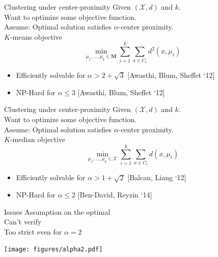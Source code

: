 \documentclass{beamer}
\newcommand{\mc}{\mathcal}
\newcommand{\mb}{\mathbf}
\begin{document}
\begin{frame}{Clustering under center-proximity}
	Given $(\mc X, d)$ and $k$.\\
	Want to optimize some objective function.\\
	
	\vspace{0.5cm}Assume: Optimal solution satisfies $\alpha$-center proximity.\\
	
	\vspace{1cm}$K$-means objective
	$$\min_{\mu_1, \ldots, \mu_k \in \mb M} \sum_{i =1}^k \sum_{x \in C_i} d^2(x, \mu_i)$$
	\begin{itemize}
		\vspace{0.4cm}\item Efficiently solvable for $\alpha > 2 + \sqrt{3}$ \alert{[Awasthi, Blum, Sheffet `12]}
		\vspace{0.4cm}\item NP-Hard for $\alpha \le 3$ \alert{[Awasthi, Blum, Sheffet `12]}
	\end{itemize}
\end{frame}

\begin{frame}{Clustering under center-proximity}	
	Given $(\mc X, d)$ and $k$.\\
	Want to optimize some objective function.\\
	
	\vspace{0.5cm}Assume: Optimal solution satisfies $\alpha$-center proximity.\\
	
	\vspace{1cm}$K$-median objective
	$$\min_{\mu_1, \ldots, \mu_k \in \mc X} \sum_{i =1}^k \sum_{x \in C_i} d(x, \mu_i)$$
		\begin{itemize}
		\vspace{0.4cm}\item Efficiently solvable for $\alpha > 1 + \sqrt{2}$ \alert{[Balcan, Liang `12]}
		\vspace{0.4cm}\item NP-Hard for $\alpha \le 2$ \alert{[Ben-David, Reyzin `14]}
	\end{itemize}
\end{frame}

\begin{frame}{Issues}
	Assumption on the optimal\\
	\vspace{0.4cm}Can't verify\\
	
	\vspace{1cm}Too strict even for $\alpha = 2$\\
	\begin{center}
	\texttt{[image: figures/alpha2.pdf]}
	\end{center}
\end{frame}
\end{document}
